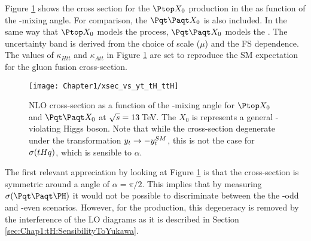 Figure \ref{fig:Chap1:xsec_vs_yt_tH_ttH} shows the cross section for the $\Ptop X_{0}$ production 
in the \tchannel as function of the \CP-mixing angle. For comparison, the $\ttbar X_0$ is also included.
In the same way that $\Ptop X_{0}$ models the \tHq process, $\ttbar X_0$ models the \ttH.
The uncertainty band is derived from the choice of scale ($\mu$) and the FS dependence.
The values of $\kappa_{Htt}$ and $\kappa_{Att}$ in  Figure \ref{fig:Chap1:xsec_vs_yt_tH_ttH} 
are set to reproduce the SM expectation for the gluon fusion cross-section. 


\begin{figure}
    \centering
    \texttt{[image: Chapter1/xsec\_vs\_yt\_tH\_ttH]}
    \caption{NLO cross-section as a function of the \CP-mixing angle for \tchannel $\Ptop X_{0}$ and $\ttbar X_0$
    at $\sqrt{s} = 13\,$TeV. 
    The $X_0$ is represents a general \CP-violating Higgs boson.
    Note that while the \ttH cross-section degenerate under the 
    transformation $y_{t} \rightarrow -y_{t}^{SM}$, this is not the case for $\sigma(tHq)$, which is sensible to $\alpha$.}
    \label{fig:Chap1:xsec_vs_yt_tH_ttH}
\end{figure}

The first relevant appreciation by looking at Figure \ref{fig:Chap1:xsec_vs_yt_tH_ttH} 
is that the \ttH cross-section is symmetric
around a \CP angle of $\alpha = \pi/2$. This implies that by measuring 
$\sigma(\ttH)$ it would not be possible to discriminate between the
the \CP-odd and \CP-even scenarios. However, for the \tHq production,
this degeneracy is removed by the interference of the LO diagrams as it 
is described in Section \ref{sec:Chap1:tH:SensibilityToYukawa}.
 


